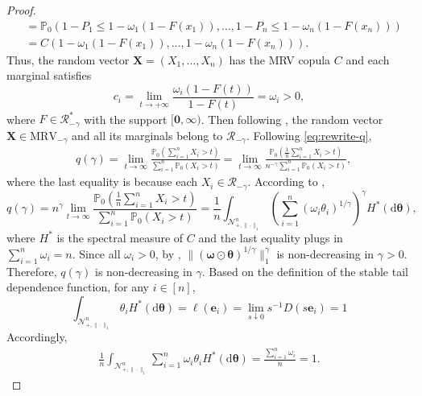 \documentclass[12pt]{article}
\theoremstyle{plain}
\theoremstyle{plain}
\theoremstyle{definition}
\renewcommand{\Pr}{\mathbb{P}}
\newcommand{\intd}{\mathrm{d}}
\newcommand{\punitsphereone}[1]{\mathcal{N}_{+,\|\cdot\|_1}^{#1}}
\begin{document}
\begin{proof}
\begin{align*}
&=\Pr_0\left(1-P_1 \le 1-\omega_1\left(1-{F}(x_1)\right),\dots,1-P_n \le 1-\omega_n\left(1-{F}(x_n)\right)\right)\\
&=C\left(1-\omega_1\left(1-{F}(x_1)\right),\dots,1-\omega_n\left(1-{F}(x_n)\right)\right).
\end{align*}
Thus, the random vector ${\mathbf{X}}=\left({X}_1,\dots,{X}_n\right)$ has the MRV copula $C$ and each marginal satisfies
\begin{equation}
\label{eq:validity-define-ci}
c_i=\lim_{t\to+\infty}\frac{\omega_i \left(1-{F}(t)\right)}{1-{F}(t)}=\omega_i>0,
\end{equation}
where ${F}\in\mathscr{R}_{-\gamma}^*$ with the support $[\mathbf{0},\mathbf{\infty})$. Then 
following , the random vector ${\mathbf{X}}\in\mathrm{MRV}_{-\gamma}$ and all its marginals belong  to $\mathscr{R}_{-\gamma}$. Following \eqref{eq:rewrite-q},
\begin{equation*}
\label{eq:change_x_to_tilde_x_validity}
\begin{split}
&q(\gamma)
=\lim_{t\to\infty}\frac{\Pr_0(\sum_{i=1}^n X_i>t)}{\sum_{i=1}^n\Pr_0( X_i>t)}
=\lim_{t\to\infty}\frac{\Pr_0(\frac{1}{n}\sum_{i=1}^n  X_i>t)}{n^{-\gamma}\sum_{i=1}^n\Pr_0( X_i>t)},
\end{split}
\end{equation*}
where the last equality is because each $ X_i\in\mathscr{R}_{-\gamma}$.
According to ,
\begin{equation}
\label{eq:error-limit}
q(\gamma)
=n^{\gamma}\lim_{t\to\infty}\frac{\Pr_0(\frac{1}{n}\sum_{i=1}^n  X_i>t)}{\sum_{i=1}^n\Pr_0( X_i>t)}
=\frac{1}{n}\int_{\punitsphereone{n}}\left(\sum_{i=1}^n(\omega_i\theta_i)^{1/\gamma}\right)^\gamma H^*(\mathrm{d}\bm{\theta}),   
\end{equation}
where $H^*$ is the spectral measure of $C$ and the last equality plugs in $\sum_{i=1}^n{\omega}_i=n$.
Since all $\omega_i>0$, by , $\|(\bm{\omega}\odot\bm{\theta})^{1/\gamma}\|_1^\gamma$ is non-decreasing in $ \gamma >0$. Therefore,
$q(\gamma)$ is non-decreasing in $\gamma$. 
Based on the definition of the stable tail dependence function, for any $i\in[n]$,
\[
\int_{\punitsphereone{n}}\theta_iH^*(\intd\bm{\theta})=\ell(\mathbf{e}_i)=\lim_{s\downarrow0}s^{-1}D(s\mathbf{e}_i)=1
\]
Accordingly,
\begin{align*} 
\frac{1}{n}\int_{\punitsphereone{n}}\sum_{i=1}^n \omega_i \theta_i H^*(\intd\bm{\theta}) = \frac{\sum_{i=1}^n\omega_i}{n}=1.

\end{align*}
\end{proof}
\end{document}
